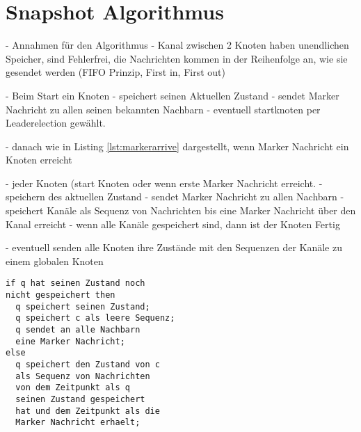 \section{Snapshot Algorithmus}
\label{sec:snapshotalg}

- Annahmen für den Algorithmus
  - Kanal zwischen 2 Knoten haben unendlichen Speicher, sind Fehlerfrei,
    die Nachrichten kommen in der Reihenfolge an, wie sie gesendet werden 
    (FIFO Prinzip, First in, First out)
    
- Beim Start ein Knoten
  - speichert seinen Aktuellen Zustand
  - sendet Marker Nachricht zu allen seinen bekannten Nachbarn
- eventuell startknoten per Leaderelection gewählt.

- danach wie in Listing \ref{lst:markerarrive} dargestellt, wenn Marker Nachricht ein Knoten erreicht

- jeder Knoten (start Knoten oder wenn erste Marker Nachricht erreicht.
  - speichern des aktuellen Zustand
  - sendet Marker Nachricht zu allen Nachbarn
  - speichert Kanäle als Sequenz von Nachrichten bis eine Marker Nachricht
   über den Kanal erreicht 
  - wenn alle Kanäle gespeichert sind, dann ist der Knoten Fertig

- eventuell senden alle Knoten ihre Zustände mit den Sequenzen der Kanäle zu einem globalen Knoten
   
   
\begin{lstlisting}[caption={Pseudo Ablauf, wenn Marker Nachricht über den Kanal c den Knoten q erreicht. \cite{snapshotChandyLamport}}, label=lst:markerarrive]
if q hat seinen Zustand noch 
nicht gespeichert then
  q speichert seinen Zustand;
  q speichert c als leere Sequenz;
  q sendet an alle Nachbarn 
  eine Marker Nachricht;
else
  q speichert den Zustand von c 
  als Sequenz von Nachrichten
  von dem Zeitpunkt als q 
  seinen Zustand gespeichert 
  hat und dem Zeitpunkt als die
  Marker Nachricht erhaelt;
\end{lstlisting}
